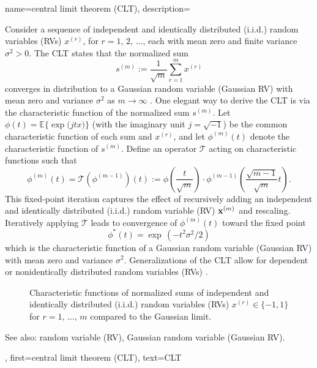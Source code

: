 {
{name={central limit theorem (CLT)},
	description={Consider a sequence of independent and identically distributed (i.i.d.) random variables (RVs) \( x^{(r)} \), for \( r = 1, \,2, \,\ldots \), 
		each with mean zero and finite variance \( \sigma^2 > 0 \). 
		The  CLT states that the normalized sum 
		\[
		s^{(m)} := \frac{1}{\sqrt{m}} \sum_{r = 1}^{m} x^{(r)} 
		\]
		converges in distribution to a Gaussian random variable (Gaussian RV) with mean zero and variance \( \sigma^2 \) as \( m \to \infty \) \cite[Proposition~2.17]{AsympVanderVaartBook}.
		One elegant way to derive the CLT is via the characteristic function of the normalized sum \( s^{(m)} \). 
		Let $ \phi(t) = \mathbb{E}  \big\{ \exp \big( j t x \big) \big\}$ (with the imaginary unit $j = \sqrt{-1}$) 
		be the common characteristic function of each sum and $x^{(r)}$, and let \( \phi^{(m)}(t) \) 
		denote the characteristic function of \( s^{(m)} \). Define an operator \( \mathcal{T} \) acting on characteristic functions 
		such that
		\[
		\phi^{(m)}(t) = \mathcal{T}(\phi^{(m-1)})(t) := \phi\left( \frac{t}{\sqrt{m}} \right) \cdot \phi^{(m-1)}\left( \frac{\sqrt{m-1}}{\sqrt{m}} t \right).
		\]
		This fixed-point iteration captures the effect of recursively adding an independent and identically distributed (i.i.d.) random variable (RV) ${\bf x}^{(m)}$ 
		and rescaling. Iteratively applying \( \mathcal{T} \) leads to convergence of \( \phi^{(m)}(t) \) toward the fixed point
		\[
		\phi^*(t) = \exp\,(-t^2 \sigma^2 / 2)
		\]
		which is the characteristic function of a Gaussian random variable (Gaussian RV) with mean zero and variance 
		\( \sigma^2 \). Generalizations of the CLT allow for dependent or nonidentically distributed random variables (RVs) \cite[Sec.~2.8]{AsympVanderVaartBook}.
		\begin{figure}[H]
			\centering
			\caption{Characteristic functions of normalized sums of independent and identically distributed (i.i.d.) random variables (RVs) $x^{(r)} \in \{-1,1\}$ 
			for $r=1,\,\ldots,\,m$ compared to the Gaussian limit.}
		\end{figure}
		See also: random variable (RV), Gaussian random variable (Gaussian RV).},
	first={central limit theorem (CLT)},
	text={CLT}
}


}
